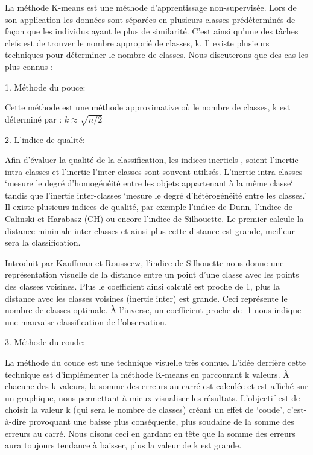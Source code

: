 \documentclass[ ]{article}
\begin{document}
\noindent
La méthode K-means est une méthode d'apprentissage non-supervisée. Lors de son application les données sont séparées en plusieurs classes prédéterminés de façon que les individus ayant le plus de similarité. C’est ainsi qu’une des tâches clefs est de trouver le nombre approprié de classes, k. Il existe plusieurs techniques pour déterminer le nombre de classes. Nous discuterons que des cas les plus connus : 
\begin{description}
  \item 1. Méthode du pouce:
  
  Cette méthode est une méthode approximative où le nombre de classes, k est déterminé par : 
$ k \approx \sqrt{n/2}$

    \item 2. L'indice de qualité:
    
	Afin d’évaluer la qualité de la classification, les indices inertiels , soient l’inertie intra-classes et l’inertie l’inter-classes sont souvent utilisés. L’inertie intra-classes ‘mesure le degré d’homogénéité entre les objets appartenant à la même classe‘ tandis que l’inertie inter-classes ‘mesure le degré d’hétérogénéité entre les classes.’
Il existe plusieurs indices de qualité, par exemple l’indice de Dunn, l’indice de Calinski et Harabasz (CH) ou encore l’indice de Silhouette. 
Le premier calcule la distance minimale inter-classes et ainsi plus cette distance est grande, meilleur sera la classification. 

Introduit par Kauffman et Rousseew, l’indice de Silhouette nous donne une représentation visuelle de la distance entre un point d’une classe avec les points des classes voisines. Plus le coefficient ainsi calculé est proche de 1, plus la distance avec les classes voisines (inertie inter) est grande. Ceci représente le nombre de classes optimale. À l’inverse, un coefficient proche de -1 nous indique une mauvaise classification de l’observation.


		\item 3. Méthode du coude:
		
  La méthode du coude est une technique visuelle très connue. L’idée derrière cette technique est d’implémenter la méthode K-means en parcourant k valeurs. À chacune des k valeurs, la somme des erreurs au carré est calculée et est affiché sur un graphique, nous permettant à mieux visualiser les résultats. L’objectif est de choisir la valeur k (qui sera le nombre de classes) créant un effet de ‘coude’, c’est-à-dire provoquant une baisse plus conséquente, plus soudaine de la somme des erreurs au carré. Nous disons ceci en gardant en tête que la somme des erreurs aura toujours tendance à baisser, plus la valeur de k est grande. 
  

\end{description}
\end{document}

